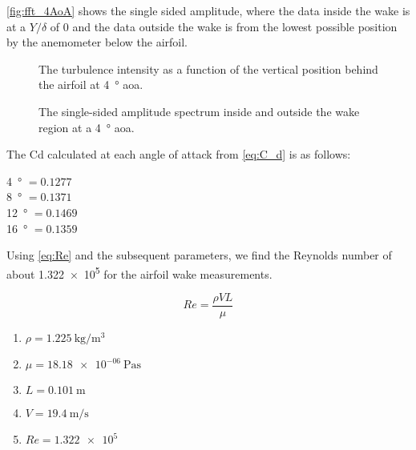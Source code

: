 \autoref{fig:fft_4AoA} shows the single sided amplitude, where the data inside the wake is at a $Y/\delta$ of 0 and the data outside the wake is from the lowest possible position by the anemometer below the airfoil. \vspace{1in}
\vspace{1in}
\begin{figure}[htpb]
    \centering
    
    \caption[A graph of the turbulence intenssity as a function of the position behind the airfoil at a four degree angle of attack.]{The turbulence intensity as a function of the vertical position behind the airfoil at \qty{4}{\degree} \acrshort{aoa}.}
    \label{fig:Ydelta_vs_turbulence_4AoA}
\end{figure}

\begin{figure}[htpb]
    \centering
    
    \caption[A graph of the single-sided amplitude spectrum inside and outside the wake at a four degree angle of attack.]{The single-sided amplitude spectrum inside and outside the wake region at a \qty{4}{\degree} \acrshort{aoa}.}
    \label{fig:fft_4AoA}
\end{figure}

The Cd calculated at each angle of attack from \autoref{eq:C_d} is as follows:
\begin{center}
    \qty{4}{\degree} $= 0.1277$\\
    \qty{8}{\degree} $= 0.1371$\\
    \qty{12}{\degree} $= 0.1469$\\
    \qty{16}{\degree} $= 0.1359$
\end{center}

Using \autoref{eq:Re} and the subsequent parameters, we find the Reynolds number of about \num{1.322e5} for the airfoil wake measurements.

\begin{equation}\label{eq:Re}
    Re = \frac{\rho V L}{\mu}
\end{equation}

\begin{enumerate}
    \item[] $\rho = \qty{1.225}{\kilogram\per\meter^3}$
    \item[] $\mu = \qty{18.18e-06}{\pascal\second}$
    \item[] $L = \qty{0.101}{\meter}$
    \item[] $V = \qty{19.4}{\meter\per\second}$
    \item[] $Re = \num{1.322e5}$
\end{enumerate}